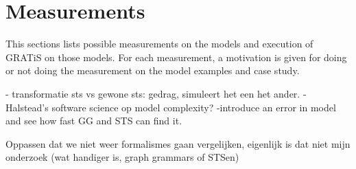 \section{Measurements}\label{sec:measurements}

This sections lists possible measurements on the models and execution of GRATiS on those models. For each measurement, a motivation is given for doing or not doing the measurement on the model examples and case study.

- transformatie sts vs gewone sts: gedrag, simuleert het een het ander.
- Halstead's software science op model complexity?
-introduce an error in model and see how fast GG and STS can find it.

Oppassen dat we niet weer formalismes gaan vergelijken, eigenlijk is dat niet mijn onderzoek (wat handiger is, graph grammars of STSen)
